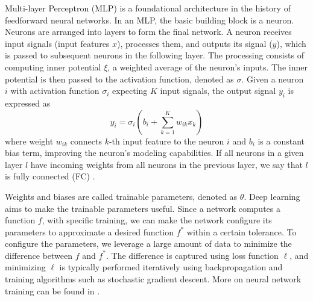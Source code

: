 Multi-layer Perceptron (MLP) is a foundational architecture in the history of feedforward neural networks.
In an MLP, the basic building block is a neuron.
Neurons are arranged into layers to form the final network.
A neuron receives input signals (input features $x$), processes them, and outputs its signal ($y$), which is passed to subsequent neurons in the following layer.
The processing consists of computing inner potential $\xi$, a weighted average of the neuron's inputs.
The inner potential is then passed to the activation function, denoted as $\sigma$. 
Given a neuron $i$ with activation function $\sigma_i$ expecting $K$ input signals, the output signal $y_i$ is expressed as
\begin{equation}
    y_i = \sigma_i(b_i + \sum_{k=1}^K w_{ik}x_k)
\end{equation}
where weight $w_{ik}$ connects $k$-th input feature to the neuron $i$ and $b_i$ is a constant bias term, improving the neuron's modeling capabilities.
If all neurons in a given layer $l$ have incoming weights from all neurons in the previous layer, we say that $l$ is fully connected (FC) \cite{goodfellow}.

Weights and biases are called trainable parameters, denoted as $\theta$.
Deep learning aims to make the trainable parameters useful.
Since a network computes a function $f$, with specific training, we can make the network configure its parameters to approximate a desired function $f^*$ within a certain tolerance.
To configure the parameters, we leverage a large amount of data to minimize the difference between $f$ and $f^*$.
The difference is captured using loss function $\ell$, and minimizing $\ell$ is typically performed iteratively using backpropagation and training algorithms such as stochastic gradient descent.
More on neural network training can be found in \cite{goodfellow}.

